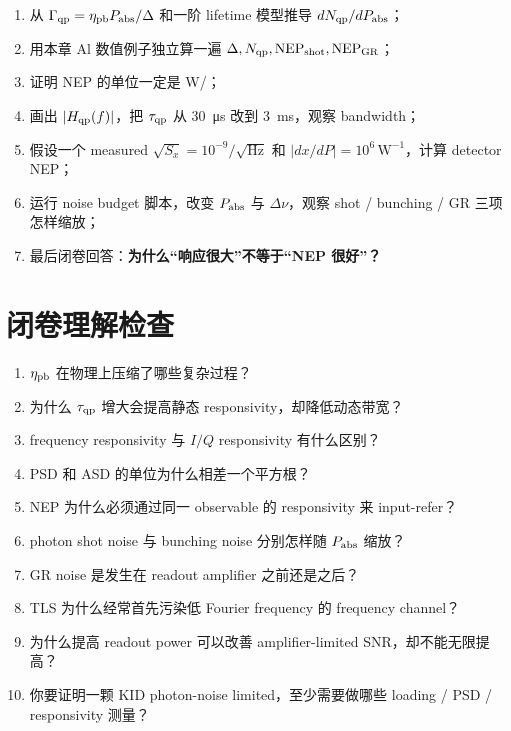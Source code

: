 \documentclass[11pt,a4paper,openany]{ctexrep}
\begin{document}
\begin{enumerate}
  \item 从 $\Gamma_{\rm qp}=\eta_{\rm pb}P_{\rm abs}/\Delta$ 和一阶 lifetime 模型推导 $dN_{\rm qp}/dP_{\rm abs}$；
  \item 用本章 Al 数值例子独立算一遍 $\Delta,N_{\rm qp},\mathrm{NEP}_{\rm shot},\mathrm{NEP}_{\rm GR}$；
  \item 证明 NEP 的单位一定是 \si{W/}；
  \item 画出 $|H_{\rm qp}(f)|$，把 $\tau_{\rm qp}$ 从 \SI{30}{\micro s} 改到 \SI{3}{ms}，观察 bandwidth；
  \item 假设一个 measured $\sqrt{S_x}=10^{-9}/\sqrt{\mathrm{Hz}}$ 和 $|dx/dP|=10^6\,\mathrm{W^{-1}}$，计算 detector NEP；
  \item 运行 noise budget 脚本，改变 $P_{\rm abs}$ 与 $\Delta\nu$，观察 shot / bunching / GR 三项怎样缩放；
  \item 最后闭卷回答：\textbf{为什么“响应很大”不等于“NEP 很好”？}
\end{enumerate}

\section{闭卷理解检查}

\begin{checkpointbox}
\begin{enumerate}
  \item $\eta_{\rm pb}$ 在物理上压缩了哪些复杂过程？
  \item 为什么 $\tau_{\rm qp}$ 增大会提高静态 responsivity，却降低动态带宽？
  \item frequency responsivity 与 $I/Q$ responsivity 有什么区别？
  \item PSD 和 ASD 的单位为什么相差一个平方根？
  \item NEP 为什么必须通过同一 observable 的 responsivity 来 input-refer？
  \item photon shot noise 与 bunching noise 分别怎样随 $P_{\rm abs}$ 缩放？
  \item GR noise 是发生在 readout amplifier 之前还是之后？
  \item TLS 为什么经常首先污染低 Fourier frequency 的 frequency channel？
  \item 为什么提高 readout power 可以改善 amplifier-limited SNR，却不能无限提高？
  \item 你要证明一颗 KID photon-noise limited，至少需要做哪些 loading / PSD / responsivity 测量？
\end{enumerate}
\end{checkpointbox}
\end{document}
